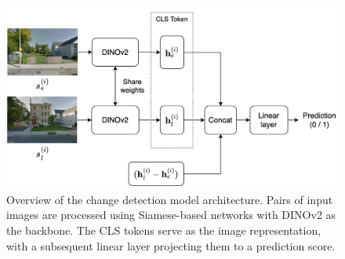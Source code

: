 \begin{figure}[h!]
    \centering
    \includegraphics[width=1.05\linewidth]{figure/change_model.png}
    \caption{Overview of the change detection model architecture. Pairs of input images are processed using Siamese-based networks with DINOv2 as the backbone. The CLS tokens serve as the image representation, with a subsequent linear layer projecting them to a prediction score.}
    \label{fig:change_model}
\end{figure}


